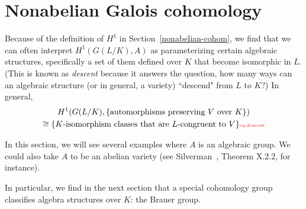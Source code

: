 \section{Nonabelian Galois cohomology}
Because of the definition of $H^1$ in Section~\ref{nonabelian-cohom}, we find that we can often interpret $H^1(G(L/K),A)$ as parameterizing certain algebraic structures, specifically a set of them defined over $K$ that become isomorphic in $L$. (This is known as {\it descent} because it answers the question, how many ways can an algebraic structure (or in general, a variety) ``descend" from $L$ to $K$?)
In general,
\begin{multline}
H^1(G(L/K),\{\text{automorphisms preserving $V$ over $K$}\})\\
\cong \{\text{$K$-isomorphism classes that are $L$-congruent to $V$}\}
\llabel{eq:descent}
\end{multline}


In this section, we will see several examples where $A$ is an algebraic group. We could also take $A$ to be an abelian variety (see Silverman~\cite{Si86}, Theorem X.2.2, for instance).

In particular, we find in the next section that a special cohomology group classifies algebra structures over $K$: the Brauer group.

